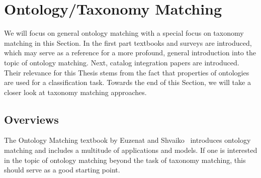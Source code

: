 \section{Ontology/Taxonomy Matching}
\label{sec:rc-ontology-matching}

We will focus on general ontology matching with a special focus on taxonomy matching in this Section.
In the first part textbooks and surveys are introduced, which may serve as a reference for a more profound, general
introduction into the  topic of ontology matching.
Next, catalog integration papers are introduced.
Their relevance for this Thesis stems from the fact that properties of ontologies are used for a classification task.
Towards the end of this Section, we will take a closer look at taxonomy matching approaches.

\subsection{Overviews}

The  Ontology Matching textbook by Euzenat and Shvaiko~\cite{euzenat2007ontology} introduces ontology
matching and includes a multitude of applications and models.
If one is interested in the topic of ontology matching beyond the task of taxonomy matching, this should serve as a
good starting point.


